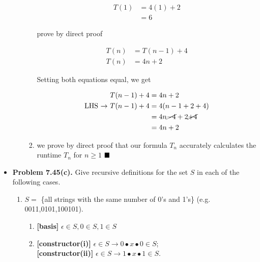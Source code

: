 \documentclass{article}
\begin{document}
\begin{itemize}
\begin{enumerate}[label=(\alph*)]
\begin{enumerate}[label=(\roman*)]
\begin{center}
                \end{center}
                \begin{align*}
                    T(1) &= 4(1) + 2\\
                         &= 6
                \end{align*}
                \begin{center}
                    prove by direct proof
                \end{center}
                \begin{align*}
                    T(n) &= T(n-1) + 4\\
                    T(n) &= 4n + 2
                \end{align*}
                \begin{center}
                    Setting both equations equal, we get
                \end{center}
                \begin{align*}
                    T(n-1) + 4 &= 4n + 2\\
                    \text{LHS $\rightarrow$ } T(n-1) + 4 &= 4(n-1 + 2 + 4)\\
                    &= 4n \cancel{-4} + 2 \cancel{+4}\\
                    &= 4n + 2
                \end{align*}
                \item we prove by direct proof that our formula $T_n$ accurately calculates the runtime $T_n$ for $n \geq 1$ $\hfill\blacksquare$
            \end{enumerate}
        \end{enumerate}
        \item \textbf{Problem 7.45(c).} Give recursive definitions for the set $S$ in each of the following cases.
        \begin{enumerate}[label=(c)]
            \item $S =$ \{all strings with the same number of 0's and 1's\} (e.g. 0011,0101,100101).
            \begin{enumerate}[label=\arabic*.]
                \item \textbf{[basis]} $\epsilon \in S, 0 \in S, 1 \in S$
                \item \textbf{[constructor(i)]} $\epsilon \in S \rightarrow 0 \bullet x \bullet 0 \in S$;\\
                \textbf{[constructor(ii)]} $\epsilon \in S \rightarrow 1 \bullet x \bullet 1 \in S$.

\end{enumerate}
\end{enumerate}
\end{itemize}
\end{document}
